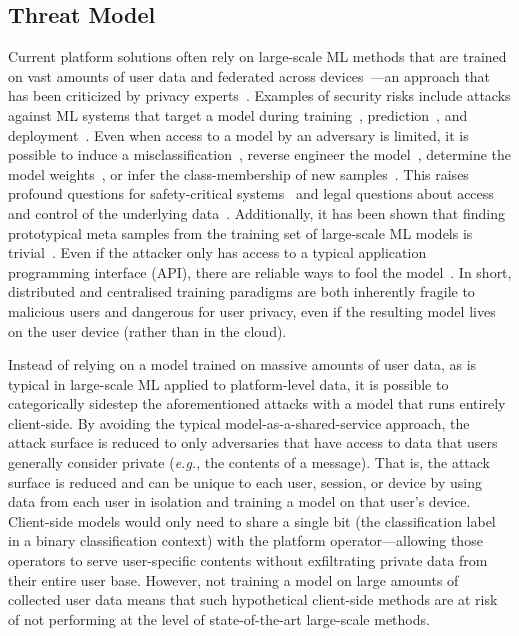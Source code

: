 \documentclass[preprint,12pt]{elsarticle}
\begin{document}
\subsection{Threat Model}
\label{threat}
Current platform solutions often rely on large-scale ML methods that are trained on vast amounts of user data and federated across devices~\cite{apple_csam}---an approach that has been criticized by privacy experts~\cite{abelson2024bugs}.
Examples of security risks include attacks against ML systems that target a model during training~\cite{biggio_poisoning_2013}, prediction~\cite{biggio_evasion_2013,deepfool,carlini_towards_2017}, and deployment~\cite{distributed_attacks,santos2021universal}.
Even when access to a model by an adversary is limited, it is possible to induce a misclassification~\cite{hopskipjump}, reverse engineer the model~\cite{extraction_attack}, determine the model weights~\cite{jagielski2020high}, or infer the class-membership of new samples~\cite{bentley2020quantifying}.
This raises profound questions for safety-critical systems~\cite{meyers} and legal questions about access and control of the underlying data~\cite{mitrou2018data,marks2023ai}.
Additionally, it has been shown that finding prototypical meta samples from the training set of large-scale ML models is trivial~\cite{chakraborty_adversarial_2018}.
Even if the attacker only has access to a typical application programming interface (API), there are reliable ways to fool the model~\cite{hopskipjump}.
In short, distributed and centralised training paradigms are both inherently fragile to malicious users and dangerous for user privacy, even if the resulting model lives on the user device (rather than in the cloud).

Instead of relying on a model trained on massive amounts of user data, as is typical in large-scale ML applied to platform-level data, it is possible to categorically sidestep the aforementioned attacks with a model that runs entirely client-side.
By avoiding the typical model-as-a-shared-service approach, the attack surface is reduced to only adversaries that have access to data that users generally consider private (\textit{e.g.}, the contents of a message).
That is, the attack surface is reduced and can be unique to each user, session, or device by using data from each user in isolation and training a model on that user's device. Client-side models would only need to share a single bit (the classification label in a binary classification context) with the platform operator---allowing those operators to serve user-specific contents without exfiltrating private data from their entire user base.
However, not training a model on large amounts of collected user data means that such hypothetical client-side methods are at risk of not performing at the level of state-of-the-art large-scale methods.
\end{document}
